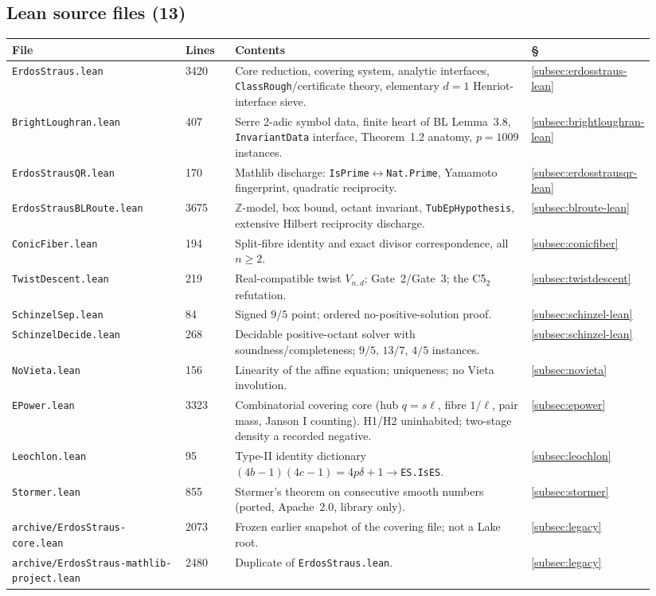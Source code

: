 \documentclass[11pt]{article}
\theoremstyle{plain}
\theoremstyle{definition}
\theoremstyle{remark}
\newcommand{\file}[1]{\texttt{#1}}
\newcommand{\lean}[1]{\texttt{#1}}
\renewcommand{\_}{\textunderscore\allowbreak}
\newcommand{\Z}{\mathbb{Z}}
\begin{document}
\subsection{Lean source files (13)}
\begingroup\small
\begin{longtable}{@{}p{0.28\linewidth}p{0.08\linewidth}p{0.50\linewidth}p{0.08\linewidth}@{}}
\toprule
\textbf{File} & \textbf{Lines} & \textbf{Contents} & \textbf{\S} \\
\midrule
\endhead
\file{ErdosStraus.lean} & 3420 & Core reduction, covering system, analytic interfaces,
  \lean{ClassRough}/certificate theory, elementary $d=1$ Henriot-interface sieve. & \ref{subsec:erdosstraus-lean} \\
\file{BrightLoughran.lean} & 407 & Serre 2-adic symbol data, finite heart of BL Lemma~3.8,
  \lean{InvariantData} interface, Theorem~1.2 anatomy, $p=1009$ instances. & \ref{subsec:brightloughran-lean} \\
\file{ErdosStrausQR.lean} & 170 & Mathlib discharge: \lean{IsPrime}$\leftrightarrow$\lean{Nat.Prime},
  Yamamoto fingerprint, quadratic reciprocity. & \ref{subsec:erdosstrausqr-lean} \\
\file{ErdosStrausBLRoute.lean} & 3675 & $\Z$-model, box bound, octant invariant,
  \lean{TubEpHypothesis}, extensive Hilbert reciprocity discharge. & \ref{subsec:blroute-lean} \\
\file{ConicFiber.lean} & 194 & Split-fibre identity and exact divisor correspondence, all $n\ge2$. & \ref{subsec:conicfiber} \\
\file{TwistDescent.lean} & 219 & Real-compatible twist $V_{n,d}$; Gate~2/Gate~3; the C5$_2$ refutation. & \ref{subsec:twistdescent} \\
\file{SchinzelSep.lean} & 84 & Signed $9/5$ point; ordered no-positive-solution proof. & \ref{subsec:schinzel-lean} \\
\file{SchinzelDecide.lean} & 268 & Decidable positive-octant solver with soundness/completeness; $9/5$, $13/7$, $4/5$ instances. & \ref{subsec:schinzel-lean} \\
\file{NoVieta.lean} & 156 & Linearity of the affine equation; uniqueness; no Vieta involution. & \ref{subsec:novieta} \\
\file{EPower.lean} & 3323 & Combinatorial covering core (hub $q=s\ell$, fibre $1/\ell$, pair mass, Janson I counting). H1/H2 uninhabited; two-stage density a recorded negative. & \ref{subsec:epower} \\
\lean{Leochlon.lean} & 95 & Type-II identity dictionary $(4b-1)(4c-1)=4p\delta+1\to$\lean{ES.IsES}. & \ref{subsec:leochlon} \\
\lean{Stormer.lean} & 855 & St\o rmer's theorem on consecutive smooth numbers (ported, Apache~2.0, library only). & \ref{subsec:stormer} \\
\texttt{archive/\allowbreak ErdosStraus-\allowbreak core.lean} & 2073 & Frozen earlier snapshot of the covering file; not a Lake root. & \ref{subsec:legacy} \\
\texttt{archive/\allowbreak ErdosStraus-\allowbreak mathlib-\allowbreak project.lean} & 2480 & Duplicate of \file{ErdosStraus.lean}. & \ref{subsec:legacy} \\
\bottomrule
\end{longtable}
\end{document}
